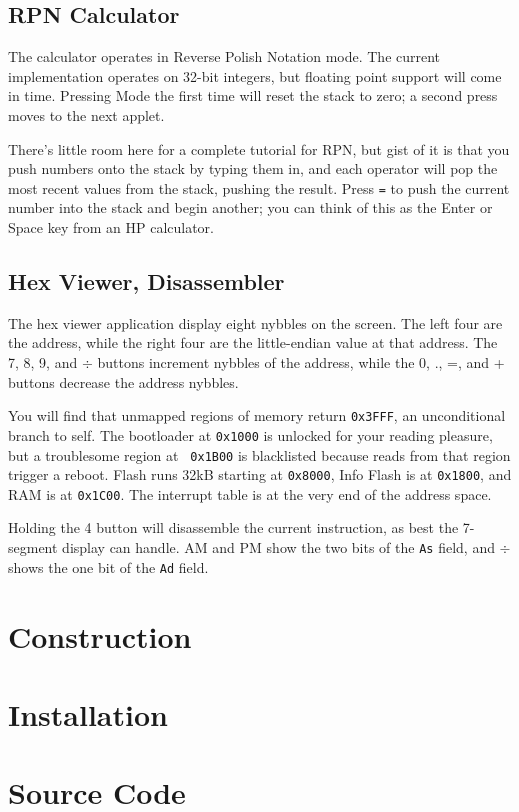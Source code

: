 \documentclass{article}
\begin{document}
\begin{multicols}{2}
\subsection*{RPN Calculator}

The calculator operates in Reverse Polish Notation mode.  The current
implementation operates on 32-bit integers, but floating point support
will come in time.  Pressing Mode the first time will reset the stack
to zero; a second press moves to the next applet.

There's little room here for a complete tutorial for RPN, but gist of
it is that you push numbers onto the stack by typing them in, and each
operator will pop the most recent values from the stack, pushing the
result.  Press {\tt =} to push the current number into the stack and
begin another; you can think of this as the Enter or Space key from an
HP calculator.

\subsection*{Hex Viewer, Disassembler}

The hex viewer application display eight nybbles on the screen.  The
left four are the address, while the right four are the little-endian
value at that address.  The 7, 8, 9, and $\div$ buttons increment
nybbles of the address, while the 0, ., =, and + buttons decrease the
address nybbles.

You will find that unmapped regions of memory return {\tt 0x3FFF}, an
unconditional branch to self.  The bootloader at {\tt 0x1000} is
unlocked for your reading pleasure, but a troublesome region at {\tt
  0x1B00} is blacklisted because reads from that region trigger a
reboot.  Flash runs 32kB starting at {\tt 0x8000}, Info Flash is at
{\tt 0x1800}, and RAM is at {\tt 0x1C00}.  The interrupt table is at
the very end of the address space.

Holding the 4 button will disassemble the current instruction, as best
the 7-segment display can handle.  AM and PM show the two bits of the
{\tt As} field, and $\div{}$ shows the one bit of the {\tt Ad} field.



\section{Construction}

\section{Installation}

\section{Source Code}



\end{multicols}
\end{document}
